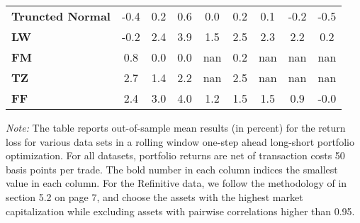 \begin{table}[p]
{\begin{tabularx}{\textwidth}{Xcccccccc}
\textbf{Truncted Normal} & \cellcolor{gray!40}-0.4 & \cellcolor{gray!27}0.2 & \cellcolor{gray!27}0.6 & \cellcolor{gray!36}0.0 & \cellcolor{gray!31}0.2 & \cellcolor{gray!36}0.1 & \cellcolor{gray!40}-0.2 & \cellcolor{gray!40}-0.5 \\
\textbf{LW} & \cellcolor{gray!31}-0.2 & \cellcolor{gray!18}2.4 & \cellcolor{gray!9}3.9 & \cellcolor{gray!27}1.5 & \cellcolor{gray!4}2.5 & \cellcolor{gray!27}2.3 & \cellcolor{gray!27}2.2 & \cellcolor{gray!27}0.2 \\
\textbf{FM} & \cellcolor{gray!22}0.8 & \cellcolor{gray!36}0.0 & \cellcolor{gray!38}0.0 & \cellcolor{gray!0}nan & \cellcolor{gray!27}0.2 & \cellcolor{gray!0}nan & \cellcolor{gray!0}nan & \cellcolor{gray!0}nan \\
\textbf{TZ} & \cellcolor{gray!0}2.7 & \cellcolor{gray!22}1.4 & \cellcolor{gray!22}2.2 & \cellcolor{gray!0}nan & \cellcolor{gray!9}2.5 & \cellcolor{gray!0}nan & \cellcolor{gray!0}nan & \cellcolor{gray!0}nan \\
\textbf{FF} & \cellcolor{gray!4}2.4 & \cellcolor{gray!4}3.0 & \cellcolor{gray!4}4.0 & \cellcolor{gray!31}1.2 & \cellcolor{gray!22}1.5 & \cellcolor{gray!31}1.5 & \cellcolor{gray!31}0.9 & \cellcolor{gray!36}-0.0 \\
\bottomrule
\end{tabularx}
\vspace{0.3em}
{\footnotesize \textit{Note:} The table reports out-of-sample mean results (in percent) for the return loss for various data sets in a rolling window one-step ahead long-short portfolio optimization. For all datasets, portfolio returns are net of transaction costs 50 basis points per trade. The bold number in each column indices the smallest value in each column. For the Refinitive data, we follow the methodology of \citet{denard2022} in section 5.2 on page 7, and choose the assets with the highest market capitalization while excluding assets with pairwise correlations higher than 0.95. }}
\end{table}